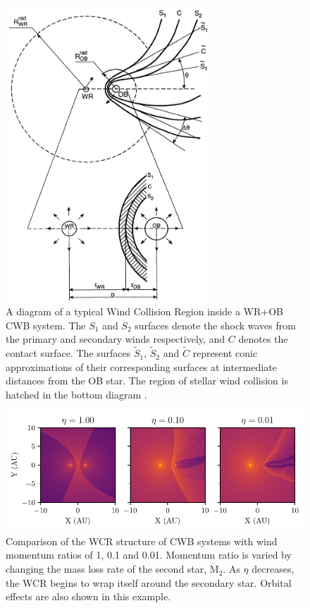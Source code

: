 \begin{figure}[h]
  \centering
  \includegraphics[width=3in]{assets/cwb-diagrams/eichler.png}
  \caption[\textit{A diagram of the Wind Collision Region \parencite{eichler_particle_1993}}]{A diagram of a typical Wind Collision Region inside a WR+OB CWB system. The $S_1$ and $S_2$ surfaces denote the shock waves from the primary and secondary winds respectively, and $C$ denotes the contact surface. The surfaces $\widetilde{S}_1$, $\widetilde{S}_2$ and $\widetilde{C}$ represent conic approximations of their corresponding surfaces at intermediate distances from the OB star. The region of stellar wind collision is hatched in the bottom diagram \parencite{eichler_particle_1993}.}
  \label{fig:wcr-diagram}
\end{figure}

\begin{figure}[h]
  \centering
  \includegraphics{assets/cwb-structure/ch1-eta-rho.pdf}
  \caption[Comparison of wind momentum ratio, $\eta$, on WCR structure]{Comparison of the WCR structure of CWB systems with wind momentum ratios of \num{1}, \num{0.1} and \num{0.01}. Momentum ratio is varied by changing the mass loss rate of the second star, $\dot{\text{M}}_2$. As $\eta$ decreases, the WCR begins to wrap itself around the secondary star. Orbital effects are also shown in this example.}
  \label{fig:wcr-eta}
\end{figure}

